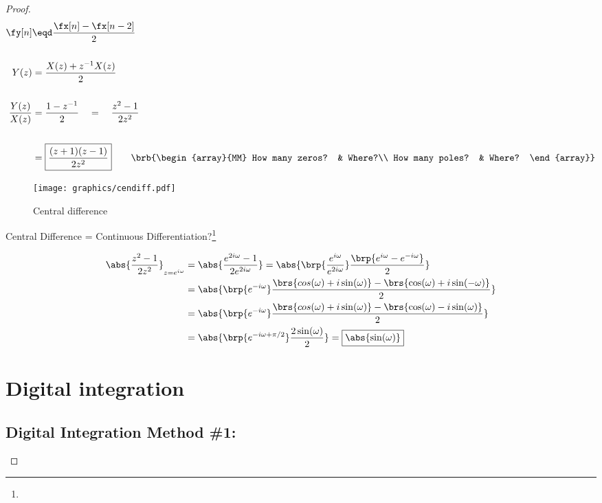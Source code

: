 \begin{proof}
\begin{align*}
  \fy[n]
    &\eqd \frac{\fx[n] - \fx[n-2]}{2}
  \\\\
  Y(z) &= \frac{X(z) + z^{-1}X(z)}{2}
  \\\\
  \frac{Y(z)}{X(z)} &= \frac{1-z^{-1}}{2} \quad=\quad {\frac{z^2-1}{2z^2}}
  \\\\
                    &= \boxed{\frac{(z+1)(z-1)}{2z^2}} 
  \qquad\brb{\begin{array}{MM}
    How many zeros? & Where?\\
    How many poles? & Where?
  \end{array}}
\end{align*}


\begin{figure}
  \centering 
  \texttt{[image: graphics/cendiff.pdf]}
  \caption{Central difference}
\end{figure}
Central Difference = Continuous Differentiation?\footnote{}
 
\begin{align*}
  \abs{\frac{z^2-1}{2z^2}}_{z=e^{i\omega}}
    &= \abs{\frac{e^{2i\omega}-1}
                 {2e^{2i\omega}}
           }
     = \abs{\brp{\frac{e^{i\omega}}{e^{2i\omega}}}
            \frac{\brp{e^{i\omega}-e^{-i\omega}}}{2}
           }
  \\&= \abs{\brp{e^{-i\omega}}
            \frac{\brs{cos(\omega)+i\sin(\omega)}-\brs{\cos(\omega)+i\sin(-\omega)}}{2}
           }
  \\&= \abs{\brp{e^{-i\omega}}
            \frac{\brs{cos(\omega)+i\sin(\omega)}-\brs{\cos(\omega)-i\sin(\omega)}}{2}
           }
  \\&= \abs{\brp{e^{-i\omega+\pi/2}}
            \frac{2\sin(\omega)}{2}
           }
     = \boxed{\abs{\sin(\omega)}}
\end{align*}


\section{Digital integration}
\subsection{Digital Integration Method \#1: }


\end{proof}
